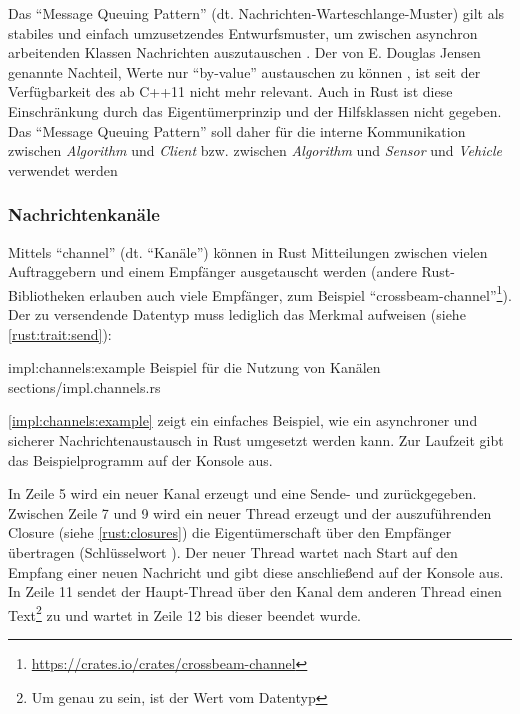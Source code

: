 Das \enquote{Message Queuing Pattern} (dt. Nachrichten-Warteschlange-Muster) gilt als stabiles und einfach umzusetzendes Entwurfsmuster, um zwischen asynchron arbeitenden Klassen Nachrichten auszutauschen \cite[207]{douglass2003real}.
Der von E. Douglas Jensen genannte Nachteil, Werte nur \enquote{by-value} austauschen zu können \cite[211]{douglass2003real}, ist seit der Verfügbarkeit des  ab C++11 nicht mehr relevant.
Auch in Rust ist diese Einschränkung durch das Eigentümerprinzip und der Hilfsklassen   nicht gegeben.
Das \enquote{Message Queuing Pattern} soll daher für die interne Kommunikation zwischen \textit{Algorithm} und \textit{Client} bzw. zwischen \textit{Algorithm} und \textit{Sensor} und \textit{Vehicle} verwendet werden

\subsubsection{Nachrichtenkanäle}

Mittels \enquote{channel} (dt. \enquote{Kanäle}) können in Rust Mitteilungen zwischen vielen Auftraggebern und einem Empfänger ausgetauscht werden (andere Rust-Bibliotheken erlauben auch viele Empfänger, zum Beispiel \enquote{crossbeam-channel}\footnote{\url{https://crates.io/crates/crossbeam-channel}}).
Der zu versendende Datentyp muss lediglich das Merkmal  aufweisen (siehe \autoref{rust:trait:send}):

\rustcinclude
	{impl:channels:example}
	{Beispiel für die Nutzung von Kanälen}
	{sections/impl.channels.rs}

\autoref{impl:channels:example} zeigt ein einfaches Beispiel, wie ein asynchroner  und sicherer Nachrichtenaustausch in Rust umgesetzt werden kann.
Zur Laufzeit gibt das Beispielprogramm  auf der Konsole aus.

In Zeile 5 wird ein neuer Kanal erzeugt und eine Sende- und  zurückgegeben.
Zwischen Zeile 7 und 9 wird ein neuer Thread erzeugt und der auszuführenden Closure (siehe \autoref{rust:closures}) die Eigentümerschaft über den Empfänger übertragen (Schlüsselwort ).
Der neuer Thread wartet nach Start auf den Empfang einer neuen Nachricht und gibt diese anschließend auf der Konsole aus.
In Zeile 11 sendet der Haupt-Thread über den Kanal dem anderen Thread einen Text\footnote{Um genau zu sein, ist der Wert vom Datentyp  } zu und wartet in Zeile 12 bis dieser beendet wurde.

